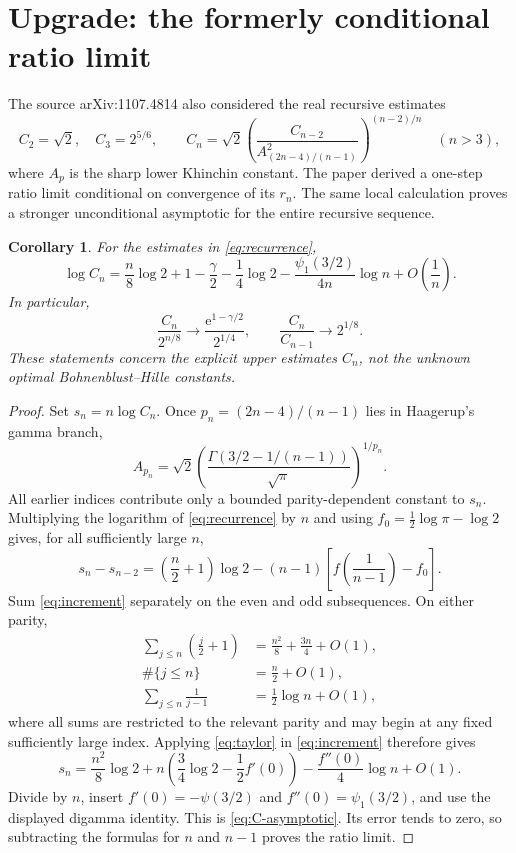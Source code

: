 \documentclass[11pt]{article}
\newtheorem{corollary}{Corollary}
\newcommand{\e}{\mathrm e}
\begin{document}
\section{Upgrade: the formerly conditional ratio limit}

The source arXiv:1107.4814 also considered the real recursive estimates
\begin{equation}\label{eq:recurrence}
 C_2=\sqrt2,\quad C_3=2^{5/6},\qquad
 C_n=\sqrt2\left(\frac{C_{n-2}}
 {A_{(2n-4)/(n-1)}^2}\right)^{(n-2)/n}\quad(n>3),
\end{equation}
where $A_p$ is the sharp lower Khinchin constant.  The paper derived a
one-step ratio limit conditional on convergence of its $r_n$.  The same local
calculation proves a stronger unconditional asymptotic for the entire
recursive sequence.

\begin{corollary}\label{cor:recurrence}
For the estimates in \eqref{eq:recurrence},
\begin{equation}\label{eq:C-asymptotic}
 \log C_n
 =\frac n8\log2+1-\frac\gamma2-\frac14\log2
  -\frac{\psi_1(3/2)}{4n}\log n+O\!\left(\frac1n\right).
\end{equation}
In particular,
\[
 \frac{C_n}{2^{n/8}}\longrightarrow
 \frac{\e^{1-\gamma/2}}{2^{1/4}},
 \qquad
 \frac{C_n}{C_{n-1}}\longrightarrow2^{1/8}.
\]
These statements concern the explicit upper estimates $C_n$, not the unknown
optimal Bohnenblust--Hille constants.
\end{corollary}

\begin{proof}
Set $s_n=n\log C_n$.  Once
$p_n=(2n-4)/(n-1)$ lies in Haagerup's gamma branch,
\[
 A_{p_n}=\sqrt2\left(
 \frac{\Gamma(3/2-1/(n-1))}{\sqrt\pi}
 \right)^{1/p_n}.
\]
All earlier indices contribute only a bounded parity-dependent constant to
$s_n$.  Multiplying the logarithm of \eqref{eq:recurrence} by $n$ and using
$f_0=\frac12\log\pi-\log2$ gives, for all sufficiently large $n$,
\begin{equation}\label{eq:increment}
 s_n-s_{n-2}
 =\left(\frac n2+1\right)\log2
 -(n-1)\left[f\!\left(\frac1{n-1}\right)-f_0\right].
\end{equation}
Sum \eqref{eq:increment} separately on the even and odd subsequences.  On
either parity,
\begin{align*}
 \sum_{j\le n}\left(\frac j2+1\right)
   &=\frac{n^2}{8}+\frac{3n}{4}+O(1),\\
 \#\{j\le n\}&=\frac n2+O(1),\\
 \sum_{j\le n}\frac1{j-1}&=\frac12\log n+O(1),
\end{align*}
where all sums are restricted to the relevant parity and may begin at any
fixed sufficiently large index.  Applying \eqref{eq:taylor} in
\eqref{eq:increment} therefore gives
\[
 s_n=\frac{n^2}{8}\log2
 +n\left(\frac34\log2-\frac12f'(0)\right)
 -\frac{f''(0)}4\log n+O(1).
\]
Divide by $n$, insert $f'(0)=-\psi(3/2)$ and
$f''(0)=\psi_1(3/2)$, and use the displayed digamma identity.  This is
\eqref{eq:C-asymptotic}.  Its error tends to zero, so subtracting the formulas
for $n$ and $n-1$ proves the ratio limit.
\end{proof}
\end{document}
